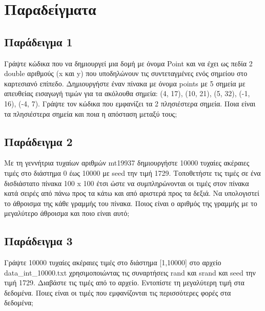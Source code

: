 \section{Παραδείγματα}
\subsection{Παράδειγμα 1}
Γράψτε κώδικα που να δημιουργεί μια δομή με όνομα Point και να έχει ως πεδία 2 double αριθμούς  (x και y) που υποδηλώνουν τις συντεταγμένες ενός σημείου στο καρτεσιανό επίπεδο. Δημιουργήστε έναν πίνακα με όνομα points με 5 σημεία με απευθείας εισαγωγή τιμών για τα ακόλουθα σημεία: (4, 17), (10, 21), (5, 32), (-1, 16), (-4, 7). Γράψτε τον κώδικα που εμφανίζει τα 2 πλησιέστερα σημεία. Ποια είναι τα πλησιέστερα σημεία και ποια η απόσταση μεταξύ τους;





\subsection{Παράδειγμα 2}
Με τη γεννήτρια τυχαίων αριθμών mt19937 δημιουργήστε 10000 τυχαίες ακέραιες τιμές στο διάστημα 0 έως 10000 με seed την τιμή 1729. Τοποθετήστε τις τιμές σε ένα δισδιάστατο πίνακα 100 x 100 έτσι ώστε να συμπληρώνονται οι τιμές στον πίνακα κατά σειρές από πάνω προς τα κάτω και από αριστερά προς τα δεξιά. Να υπολογιστεί το άθροισμα της κάθε γραμμής του πίνακα. Ποιος είναι ο αριθμός της γραμμής με το μεγαλύτερο άθροισμα και ποιο είναι αυτό;





\subsection{Παράδειγμα 3}
Γράψτε 10000 τυχαίες ακέραιες τιμές στο διάστημα [1,10000] στο αρχείο data\_int\_10000.txt χρησιμοποιώντας τις συναρτήσεις rand και srand και seed την τιμή 1729. Διαβάστε τις τιμές από το αρχείο. Εντοπίστε τη μεγαλύτερη τιμή στα δεδομένα. Ποιες είναι οι τιμές  που εμφανίζονται τις περισσότερες φορές στα δεδομένα;



